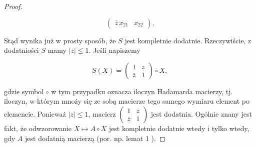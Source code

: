 \begin{proof}
\begin{linenomath*}
\begin{equation}
\begin{pmatrix}
\overline{z} \, x_{21} & x_{22}
\end{pmatrix}.
 \end{equation}
\end{linenomath*}
Stąd wynika już w prosty sposób, że $S$ jest kompletnie dodatnie.
Rzeczywiście,
z dodatniości $S$ mamy $|z| \leq 1$.
Jeśli napiszemy
\begin{linenomath*}
 \begin{equation}
S(X) =
\begin{pmatrix}
1 & z \\ \overline{z} & 1
\end{pmatrix} \circ X,
 \end{equation}
\end{linenomath*}
gdzie symbol $\circ$ w tym przypadku oznacza iloczyn Hadamarda macierzy,
tj. iloczyn, w którym mnoży się ze sobą macierze tego samego wymiaru
element po elemencie.
Ponieważ $|z| \leq 1$, macierz
$
\left(
\begin{smallmatrix} 1 & z \\ \overline{z} & 1 \end{smallmatrix}
\right)$
jest dodatnia.
Ogólnie znany jest fakt, że odwzorowanie $X \mapsto A \circ X$
jest kompletnie dodatnie wtedy i tylko wtedy, gdy $A$
jest dodatnią macierzą
(por. np. lemat 1 \cite{besenyei2011completely}).
\end{proof}

